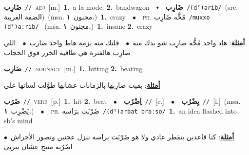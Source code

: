 \documentclass[10pt,a4paper,twoside]{article} %
\begin{document}
\begin{multicols}{2}
{\setlength\topsep{0pt}\textbf{\foreignlanguage{arabic}{ضَارِب}}\ {\color{gray}\texttt{//}\color{black}}\ \textsc{adj}\ [m.]\ \textbf{1.}~a la mode.  \textbf{2.}~bandwagon\ \ $\smblkdiamond$\ \ \setlength\topsep{0pt}\textbf{\foreignlanguage{arabic}{ضَارِب}}\ {\color{gray}\texttt{/(dˤ)arib/}\color{black}}\ (src. \color{gray}\foreignlanguage{arabic}{الضفة الغربية}\color{black})\ \color{gray}(msa. \foreignlanguage{arabic}{مجنون}~\foreignlanguage{arabic}{\textbf{١.}})\color{black}\ \textbf{1.}~crazy\ \ $\bullet$\ \ \textsc{ph.} \color{gray} \foreignlanguage{arabic}{مُخُّه ضَارِب}\color{black}\ {\color{gray}\texttt{/{\sffamily muxxo (dˤ)aːrib}/}\color{black}}\ \color{gray} (msa. \foreignlanguage{arabic}{مجنون}~\foreignlanguage{arabic}{\textbf{١.}})\color{black}\ \textbf{1.}~insane  \textbf{2.}~crazy\  \begin{flushright}\color{gray}\foreignlanguage{arabic}{\textbf{\underline{\foreignlanguage{arabic}{أمثلة}}}: هاد واحد مُخُّه ضارِب شو بدك منه\ $\bullet$\ \  فلتك منه يزمة هاظ واحد ضارب\ $\bullet$\ \  اللي ضارِب هالفترة هي طاقية الخرز فوق الحجاب}\end{flushright}\color{black}} \vspace{2mm}

{\setlength\topsep{0pt}\textbf{\foreignlanguage{arabic}{ضَارِب}}\ {\color{gray}\texttt{//}\color{black}}\ \textsc{noun\textunderscore act}\ [m.]\ \textbf{1.}~hitting  \textbf{2.}~beating\  \begin{flushright}\color{gray}\foreignlanguage{arabic}{\textbf{\underline{\foreignlanguage{arabic}{أمثلة}}}: بقيت ضارِبها بالزمانات عشانها طوَّلت لسانها علي}\end{flushright}\color{black}} \vspace{2mm}

{\setlength\topsep{0pt}\textbf{\foreignlanguage{arabic}{ضَرَب}}\ {\color{gray}\texttt{//}\color{black}}\ \textsc{verb}\ [p.]\ \textbf{1.}~hit  \textbf{2.}~beat\ \ $\bullet$\ \ \setlength\topsep{0pt}\textbf{\foreignlanguage{arabic}{اِضْرُب}}\ {\color{gray}\texttt{//}\color{black}}\ [c.]\ \ $\bullet$\ \ \setlength\topsep{0pt}\textbf{\foreignlanguage{arabic}{يِضْرُب}}\ {\color{gray}\texttt{//}\color{black}}\ [i.]\ \color{gray}(msa. \foreignlanguage{arabic}{يَضْرِب}~\foreignlanguage{arabic}{\textbf{١.}})\color{black}\ \ $\bullet$\ \ \textsc{ph.} \color{gray} \foreignlanguage{arabic}{ضَرْبَت برَاسه}\color{black}\ {\color{gray}\texttt{/{\sffamily (dˤ)arbat braːso}/}\color{black}}\ \textbf{1.}~an idea flashed into sb's mind\  \begin{flushright}\color{gray}\foreignlanguage{arabic}{\textbf{\underline{\foreignlanguage{arabic}{أمثلة}}}: كنا قاعدين بنفطر عادي ولا هو ضَرْبَت براسه ننزل عجنين ونصور الأحراش\ $\bullet$\ \  اضْرُبه منيح عشان يتربى}\end{flushright}\color{black}} \vspace{2mm}


\end{multicols}
\end{document}
